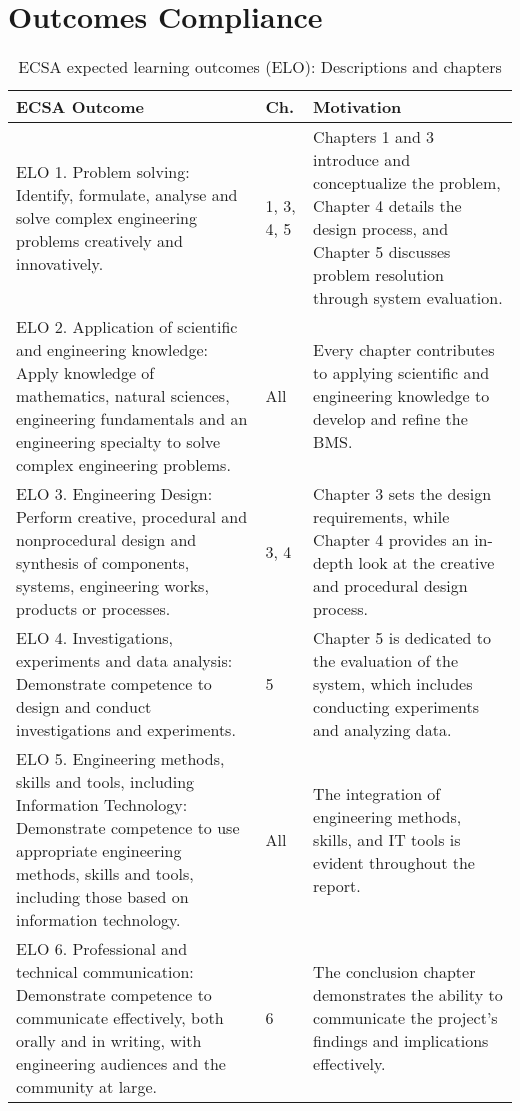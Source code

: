 \chapter{Outcomes Compliance}
\makeatletter{}\makeatother
\label{appen:OC}


\begin{table}[h]
\hspace*{-4cm} %
\caption{ECSA expected learning outcomes (ELO): Descriptions and chapters}
\begin{tabular}{|p{8.5cm}|p{1cm}|p{6.5cm}|}
\hline
\textbf{ECSA Outcome} & \textbf{Ch.} & \textbf{Motivation} \\
\hline
ELO 1. Problem solving: Identify, formulate, analyse and solve complex engineering problems creatively and innovatively. & 1, 3, 4, 5 & Chapters 1 and 3 introduce and conceptualize the problem, Chapter 4 details the design process, and Chapter 5 discusses problem resolution through system evaluation. \\
\hline
ELO 2. Application of scientific and engineering knowledge: Apply knowledge of mathematics, natural sciences, engineering fundamentals and an engineering specialty to solve complex engineering problems. & All & Every chapter contributes to applying scientific and engineering knowledge to develop and refine the BMS. \\
\hline
ELO 3. Engineering Design: Perform creative, procedural and nonprocedural design and synthesis of components, systems, engineering works, products or processes. & 3, 4 & Chapter 3 sets the design requirements, while Chapter 4 provides an in-depth look at the creative and procedural design process. \\
\hline
ELO 4. Investigations, experiments and data analysis: Demonstrate competence to design and conduct investigations and experiments. & 5 & Chapter 5 is dedicated to the evaluation of the system, which includes conducting experiments and analyzing data. \\
\hline
ELO 5. Engineering methods, skills and tools, including Information Technology: Demonstrate competence to use appropriate engineering methods, skills and tools, including those based on information technology. & All & The integration of engineering methods, skills, and IT tools is evident throughout the report. \\
\hline
ELO 6. Professional and technical communication: Demonstrate competence to communicate effectively, both orally and in writing, with engineering audiences and the community at large. & 6 & The conclusion chapter demonstrates the ability to communicate the project's findings and implications effectively. \\

\end{tabular}
\end{table}
